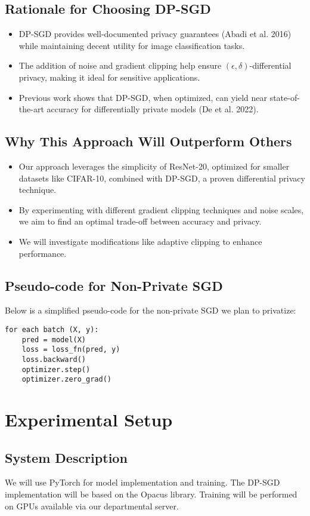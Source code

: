 \documentclass{article}
\begin{document}
\subsection{Rationale for Choosing DP-SGD}
\begin{itemize}
    \item DP-SGD provides well-documented privacy guarantees (Abadi et al. 2016) while maintaining decent utility for image classification tasks.
    \item The addition of noise and gradient clipping help ensure $(\epsilon, \delta)$-differential privacy, making it ideal for sensitive applications.
    \item Previous work shows that DP-SGD, when optimized, can yield near state-of-the-art accuracy for differentially private models (De et al. 2022).
\end{itemize}

\subsection{Why This Approach Will Outperform Others}
\begin{itemize}
    \item Our approach leverages the simplicity of ResNet-20, optimized for smaller datasets like CIFAR-10, combined with DP-SGD, a proven differential privacy technique.
    \item By experimenting with different gradient clipping techniques and noise scales, we aim to find an optimal trade-off between accuracy and privacy.
    \item We will investigate modifications like adaptive clipping to enhance performance.
\end{itemize}

\subsection{Pseudo-code for Non-Private SGD}
Below is a simplified pseudo-code for the non-private SGD we plan to privatize:
\begin{verbatim}
for each batch (X, y):
    pred = model(X)
    loss = loss_fn(pred, y)
    loss.backward()
    optimizer.step()
    optimizer.zero_grad()
\end{verbatim}

\section{Experimental Setup}
\subsection{System Description}
We will use PyTorch for model implementation and training. The DP-SGD implementation will be based on the Opacus library. Training will be performed on GPUs available via our departmental server.
\end{document}
